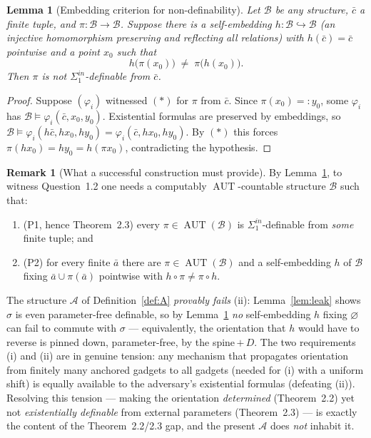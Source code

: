 \documentclass[12pt,fullpage]{article}
\newtheorem{lemma}[theorem]{Lemma}
\theoremstyle{definition}
\newtheorem{remark}[theorem]{Remark}
\newcommand{\A}{\mathcal{A}}
\newcommand{\B}{\mathcal{B}}
\newcommand{\AUT}{\operatorname{AUT}}
\renewcommand{\phi}{\varphi}
\begin{document}
\begin{lemma}[Embedding criterion for non-definability]\label{lem:embcrit}
Let $\B$ be any structure, $\bar c$ a finite tuple, and $\pi\colon\B\to\B$.
Suppose there is a self-embedding $h\colon\B\hookrightarrow\B$ (an injective
homomorphism preserving and reflecting all relations) with $h(\bar c)=\bar c$
pointwise and a point $x_0$ such that
\[
h\bigl(\pi(x_0)\bigr)\;\neq\;\pi\bigl(h(x_0)\bigr).
\]
Then $\pi$ is \emph{not} $\Sigma^{in}_1$-definable from $\bar c$.
\end{lemma}

\begin{proof}
Suppose $(\phi_i)$ witnessed $(\ast)$ for $\pi$ from $\bar c$.  Since
$\pi(x_0)=:y_0$, some $\phi_i$ has $\B\models\phi_i(\bar c,x_0,y_0)$.
Existential formulas are preserved by embeddings, so
$\B\models\phi_i(h\bar c,h x_0,h y_0)=\phi_i(\bar c,h x_0,h y_0)$.  By $(\ast)$
this forces $\pi(h x_0)=h y_0=h(\pi x_0)$, contradicting the hypothesis.
\end{proof}

\begin{remark}[What a successful construction must provide]\label{rem:spec}
By Lemma~\ref{lem:embcrit}, to witness Question~1.2 one needs a computably
$\AUT$-countable structure $\B$ such that:
\begin{enumerate}[label=(\roman*)]
\item (P1, hence Theorem~2.3) every $\pi\in\AUT(\B)$ is
  $\Sigma^{in}_1$-definable from \emph{some} finite tuple; and
\item (P2) for every finite $\bar a$ there are $\pi\in\AUT(\B)$ and a
  self-embedding $h$ of $\B$ fixing $\bar a\cup\pi(\bar a)$ pointwise with
  $h\circ\pi\neq\pi\circ h$.
\end{enumerate}
The structure $\A$ of Definition~\ref{def:A} \emph{provably fails} (ii):
Lemma~\ref{lem:leak} shows $\sigma$ is even parameter-free definable, so by
Lemma~\ref{lem:embcrit} \emph{no} self-embedding $h$ fixing $\varnothing$ can
fail to commute with $\sigma$ --- equivalently, the orientation that $h$ would
have to reverse is pinned down, parameter-free, by the spine\,$+$\,$D$.  The
two requirements (i) and (ii) are in genuine tension: any mechanism that
propagates orientation from finitely many anchored gadgets to all gadgets
(needed for (i) with a uniform shift) is equally available to the adversary's
existential formulas (defeating (ii)).  Resolving this tension --- making the
orientation \emph{determined} (Theorem~2.2) yet not \emph{existentially
definable} from external parameters (Theorem~2.3) --- is exactly the content of
the Theorem~2.2/2.3 gap, and the present $\A$ does \emph{not} inhabit it.
\end{remark}
\end{document}
